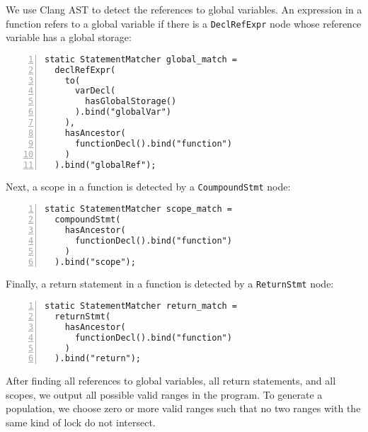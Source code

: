 We use Clang AST to detect the references to global variables. An expression in a function refers to a global variable if there is a \verb|DeclRefExpr| node whose reference variable has a global storage:

\begin{lstlisting}[frame=tb, xleftmargin=2em, framexleftmargin=1.5em, numbers=left]
static StatementMatcher global_match =
  declRefExpr(
    to(
      varDecl(
        hasGlobalStorage()
      ).bind("globalVar")
    ),
    hasAncestor(
      functionDecl().bind("function")
    )
  ).bind("globalRef");
  \end{lstlisting}

Next, a scope in a function is detected by a \verb|CoumpoundStmt| node:

\begin{lstlisting}[frame=tb, xleftmargin=2em, framexleftmargin=1.5em, numbers=left]
static StatementMatcher scope_match =
  compoundStmt(
    hasAncestor(
      functionDecl().bind("function")
    )
  ).bind("scope");
\end{lstlisting}

Finally, a return statement in a function is detected by a \verb|ReturnStmt| node:

\begin{lstlisting}[frame=tb, xleftmargin=2em, framexleftmargin=1.5em, numbers=left]
static StatementMatcher return_match =
  returnStmt(
    hasAncestor(
      functionDecl().bind("function")
    )
  ).bind("return");
\end{lstlisting}

After finding all references to global variables, all return statements, and all scopes, we output all possible valid ranges in the program. To generate a population, we choose zero or more valid ranges such that no two ranges with the same kind of lock do not intersect.
